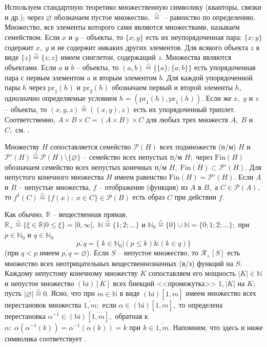 \documentclass[10pt]{SPIIRAS_Proceedings}
\begin{document}
Используем стандартную теоретико множественную символику
(кванторы, связки и др.);
через $\varnothing$ обозначаем пустое множество,
$\stackrel{\triangle}{=}$ -- равенство по определению.
Множество, все элементы которого сами являются множествами,
называем семейством.
Если $x$ и $y$ -- объекты,
то $\{x;y\}$
есть их неупорядоченная пара:
$\{x;y\}$ содержит $x,\;y$
и не содержит никаких других элементов.
Для всякого объекта $z$ в виде $\{z\} \stackrel{\triangle}{=} \{z;z\}$
имеем синглетон,
содержащий $z$.
Множества являются объектами.
Если $a$ и $b$ -- объекты, то
\cite[c.~67]{15}
$(a,b) \stackrel{\triangle}{=} \{\{a\};\{a;b\}\}$
есть упорядоченная пара с первым элементом $a$ и вторым элементом $b$.
Для каждой упорядоченной пары $h$ через
$\mathrm{pr}_1(h)$ и $\mathrm{pr}_2(h)$
обозначаем первый и второй элементы $h$,
однозначно определяемые условием
$h = (\mathrm{pr} _1(h),\mathrm{pr} _1(h))$.
Если же $x,\;y$ и $z$ -- объекты,
то $(x,y,z) \stackrel{\triangle}{=} ((x,y),z)$
есть их упорядоченный триплет.
Соответственно,
$A \times B \times C = (A \times B) \times C$
для любых трех множеств $A,\;B$ и $C;$ см.
\cite[c.17]{16}.

Множеству $H$
сопоставляется семейство $\mathcal{P}(H)$
всех подмножеств (п/м) $H$
и $\mathcal{P}'(H) \stackrel{\triangle}{=}
\mathcal{P}(H) \setminus \{\varnothing\}$ -- семейство всех непустых п/м $H;$
через $\mathrm{Fin}(H)$
обозначаем семейство всех непустых конечных п/м
$H,\;\mathrm{Fin}(H) \subset \mathcal{P}'(H).$
Для непустого конечного множества $H$ имеем равенство
$\mathrm{Fin}(H) = \mathcal{P}'(H).$
Если $A$ и $B$ -- непустые множества,
$f$ -- отображение (функция) из $A$ в $B,$
а $C \in \mathcal{P}(A),$ то
$f^1(C) \stackrel{\triangle}{=} \{f(x):\;x \in C\} \in \mathcal{P}(B)$
есть образ $C$ при действии $f.$

Как обычно,
$\mathbb{R}$ -- вещественная прямая,
$\mathbb{R}_+ \stackrel{\triangle}{=} \{\xi \in \mathbb{R} \vert 0 \le \xi\} = [0,\infty[,\;\mathbb{N} \stackrel{\triangle}{=} \{1;2;...\}$
и $\mathbb{N}_0 \stackrel{\triangle}{=} \{0\} \cup \mathbb{N} = \{0;1;2;...\};$
при $p \in \mathbb{N}_0$ и $q \in \mathbb{N}_0$
$$
\overline{p,q} = \{\;k \in \mathbb{N}_0 \vert (p \le k) \& (k \in q)\}
$$
(при $q < p$ имеем $\overline{p,q} = \varnothing$).
Если $S$ -- непустое множество, то
$\mathcal{R}_+[S]$
есть множество всех неотрицательных вещественнозначных (в/з) функций на $S.$
Каждому непустому конечному множеству $K$
сопоставляем его мощность $|K| \in \mathbb{N}$
и непустое множество $(\mathrm{bi})[K]$
всех биекций
\cite[c.~87]{17} <<промежутка>>
$\overline{1,|K|}$ на $K;$
пусть
$|\varnothing| \stackrel{\triangle}{=} 0.$
Ясно, что при
$m \in \mathbb{N}$ в виде $(\mathrm{bi})[\overline{1,m}]$
имеем множество всех перестановок
\cite[c.~87]{17} множества
$\overline{1,m};$
если $\alpha \in (\mathrm{bi})[\overline{1,m}],$
то определена перестановка
$\alpha^{-1} \in (\mathrm{bi})[\overline{1,m}],$
обратная к
$\alpha:\;\alpha(\alpha^{-1}(k)) = \alpha^{-1}(\alpha(k)) = k$
при $k \in \overline{1,m}.$
Напомним, что здесь и ниже символика соответствует
\cite[$\S$3.1]{4}.
\end{document}
